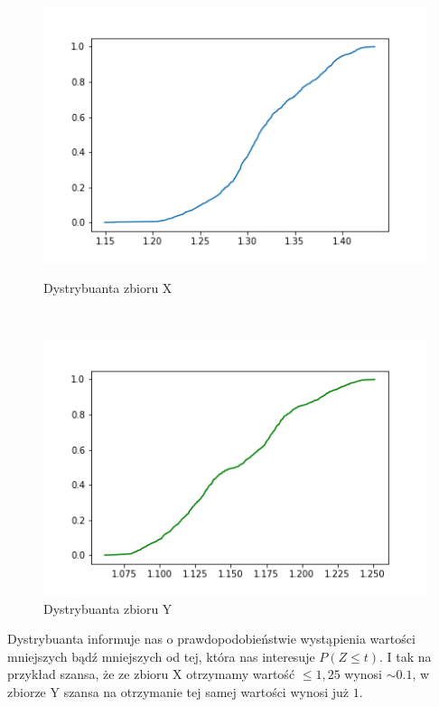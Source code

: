 \documentclass[12pt]{mwart}
\begin{document}
\begin{figure}[H]
	\begin{minipage}{.5\linewidth}
		\centering
		\includegraphics[scale=0.7]{X_cdf.PNG}
		\caption{Dystrybuanta zbioru X}
	\end{minipage}
	$\quad$
	\begin{minipage}{.5\linewidth}
		\centering
		\includegraphics[scale=0.7]{Y_cdf.PNG}
		\caption{Dystrybuanta zbioru Y}
	\end{minipage}
\end{figure}
\noindent Dystrybuanta informuje nas o prawdopodobieństwie wystąpienia wartości mniejszych bądź mniejszych od tej, która nas interesuje $P(Z \leq t)$. I tak na przykład szansa, że ze zbioru X otrzymamy wartość $\leq 1,25$ wynosi $\sim 0.1$, w zbiorze Y szansa na otrzymanie tej samej wartości wynosi już $1$.
\end{document}
